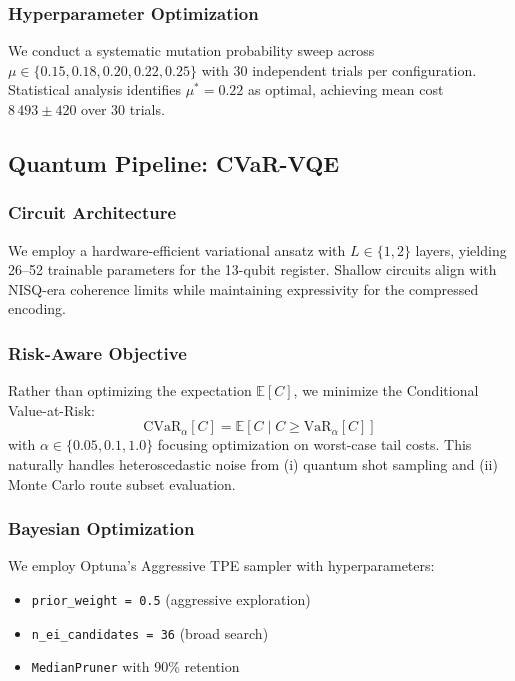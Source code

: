 \subsubsection{Hyperparameter Optimization}
We conduct a systematic mutation probability sweep across $\mu \in \{0.15, 0.18, 0.20, 0.22, 0.25\}$ with 30 independent trials per configuration.
Statistical analysis identifies $\mu^* = 0.22$ as optimal, achieving mean cost $8\,493 \pm 420$ over 30 trials.


\subsection{Quantum Pipeline: CVaR-VQE}

\subsubsection{Circuit Architecture}
We employ a hardware-efficient variational ansatz with $L \in \{1, 2\}$ layers, yielding 26--52 trainable parameters for the 13-qubit register.
Shallow circuits align with NISQ-era coherence limits while maintaining expressivity for the compressed encoding.

\subsubsection{Risk-Aware Objective}
Rather than optimizing the expectation $\mathbb{E}[C]$, we minimize the Conditional Value-at-Risk:
\[
\text{CVaR}_\alpha[C] = \mathbb{E}[C \mid C \geq \text{VaR}_\alpha[C]]
\]
with $\alpha \in \{0.05, 0.1, 1.0\}$ focusing optimization on worst-case tail costs.
This naturally handles heteroscedastic noise from (i) quantum shot sampling and (ii) Monte Carlo route subset evaluation.

\subsubsection{Bayesian Optimization}
We employ Optuna's Aggressive TPE sampler with hyperparameters:
\begin{itemize}
    \item \texttt{prior_weight = 0.5} (aggressive exploration)
    \item \texttt{n_ei_candidates = 36} (broad search)
    \item \texttt{MedianPruner} with 90\% retention
\end{itemize}

